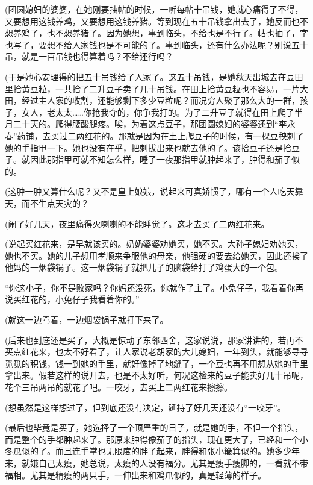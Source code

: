 \par (团圆媳妇的婆婆，在她刚要抽帖的时候，一听每帖十吊钱，她就心痛得了不得，又要想用这钱养鸡，又要想用这钱养猪。等到现在五十吊钱拿出去了，她反而也不想养鸡了，也不想养猪了。因为她想，事到临头，不给也是不行了。帖也抽了，字也写了，要想不给人家钱也是不可能的了。事到临头，还有什么办法呢？别说五十吊，就是一百吊钱也得算着吗？不给还行吗？
\par (于是她心安理得的把五十吊钱给了人家了。这五十吊钱，是她秋天出城去在豆田里拾黄豆粒，一共拾了二升豆子卖了几十吊钱。在田上拾黄豆粒也不容易，一片大田，经过主人家的收割，还能够剩下多少豆粒呢？而况穷人聚了那么大的一群，孩子，女人，老太太……你抢我夺的，你争我打的。为了二升豆子就得在田上爬了半月二十天的。爬得腰酸腿疼。唉，为着这点豆子，那团圆媳妇的婆婆还到“李永春”药铺，去买过二两红花的。那就是因为在土上爬豆子的时候，有一棵豆秧刺了她的手指甲一下。她也没有在乎，把刺拔出来也就去他的了。该拾豆子还是拾豆子。就因此那指甲可就不知怎么样，睡了一夜那指甲就肿起来了，肿得和茄子似的。
\par (这肿一肿又算什么呢？又不是皇上娘娘，说起来可真娇惯了，哪有一个人吃天靠天，而不生点天灾的？
\par (闹了好几天，夜里痛得火喇喇的不能睡觉了。这才去买了二两红花来。
\par (说起买红花来，是早就该买的。奶奶婆婆劝她买，她不买。大孙子媳妇劝她买，她也不买。她的儿子想用孝顺来争服他的母亲，他强硬的要去给她买，因此还挨了他妈的一烟袋锅子。这一烟袋锅子就把儿子的脑袋给打了鸡蛋大的一个包。
\par “你这小子，你不是败家吗？你妈还没死，你就作了主了。小兔仔子，我看着你再说买红花的，小兔仔子我看着你的。”
\par (就这一边骂着，一边烟袋锅子就打下来了。
\par (后来也到底还是买了，大概是惊动了东邻西舍，这家说说，那家讲讲的，若再不买点红花来，也太不好看了，让人家说老胡家的大儿媳妇，一年到头，就能够寻寻觅觅的积钱，钱一到她的手里，就好像掉了地缝了，一个豆也再不用想从她的手里拿出来。假若这样的说开去，也是不太好听，何况这检来的豆子能卖好几十吊呢，花个三吊两吊的就花了吧。一咬牙，去买上二两红花来擦擦。
\par (想虽然是这样想过了，但到底还没有决定，延持了好几天还没有“一咬牙”。
\par (最后也毕竟是买了，她选择了一个顶严重的日子，就是她的手，不但一个指头，而是整个的手都肿起来了。那原来肿得像茄子的指头，现在更大了，已经和一个小冬瓜似的了。而且连手掌也无限度的胖了起来，胖得和张小簸箕似的。她多少年来，就嫌自己太瘦，她总说，太瘦的人没有福分。尤其是瘦手瘦脚的，一看就不带福相。尤其是精瘦的两只手，一伸出来和鸡爪似的，真是轻薄的样子。
